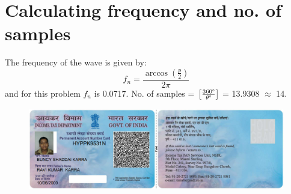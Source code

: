 \documentclass[a4paper,12pt]{article}
\begin{document}
    \section{Calculating frequency and no. of samples}
      The frequency of the wave is given by:
      \[
      f_n = \frac{\arccos(\frac{p}{2})}{2\pi}
      \]
      and for this problem $f_n$ is 0.0717.\newline \newline
      No. of samples =  $\left[\frac{360\degree}{\theta\degree}\right]$ = 13.9308 $\approx$ 14.

      
\pagebreak

\begin{figure}
 \includegraphics[scale=0.5]{panb.PNG}
\end{figure}
\end{document}
